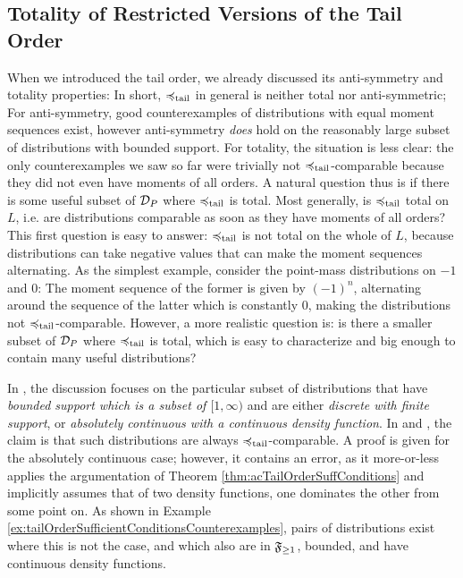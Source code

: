 \documentclass[a4paper]{scrreprt}
\begin{document}
    \subsection{Totality of Restricted Versions of the Tail Order}
    When we introduced the tail order, we already discussed its anti-symmetry and totality properties: In short, $\preccurlyeq_{\text{tail}}$ in general is neither total nor anti-symmetric; For anti-symmetry, good counterexamples of distributions with equal moment sequences exist, however anti-symmetry \emph{does} hold on the reasonably large subset of distributions with bounded support.
    For totality, the situation is less clear: the only counterexamples we saw so far were trivially not $\preccurlyeq_{\text{tail}}$-comparable because they did not even have moments of all orders.
    A natural question thus is if there is some useful subset of $\mathcal{D}_P$ where $\preccurlyeq_{\text{tail}}$ is total. Most generally, is $\preccurlyeq_{\text{tail}}$ total on $L$, i.e. are distributions comparable as soon as  they have moments of all orders? This first question is easy to answer: $\preccurlyeq_{\text{tail}}$ is not total on the whole of $L$, because distributions can take negative values that can make the moment sequences alternating. 
    As the simplest example, consider the point-mass distributions on $-1$ and $0$: The moment sequence of the former is given by $(-1)^n$, alternating around the sequence of the latter which is constantly $0$, making the distributions not $\preccurlyeq_{\text{tail}}$-comparable.
    However, a more realistic question is: is there a smaller subset of $\mathcal{D}_P$ where $\preccurlyeq_{\text{tail}}$ is total, which is easy to characterize and big enough to contain many useful distributions?
    
    In \cite{bib:rassGameRiskManagI,bib:rassTotalOrderingOnLossDistributions}, the discussion focuses on the particular subset of distributions that have \emph{bounded support which is a subset of $[1, \infty)$} and are either \emph{discrete with finite support}, or \emph{absolutely continuous with a continuous density function}.
    In \cite[Lemma 2]{bib:rassTotalOrderingOnLossDistributions} and \cite[Lemma 2.4]{bib:rassGameRiskManagI}, the claim is that such distributions are always $\preccurlyeq_{\text{tail}}$-comparable.
    A proof is given for the absolutely continuous case; however, it contains an error, as it more-or-less applies the argumentation of Theorem \ref{thm:acTailOrderSuffConditions} and implicitly assumes that of two density functions, one dominates the other from some point on. As shown in Example \ref{ex:tailOrderSufficientConditionsCounterexamples}, pairs of distributions exist where this is not the case, and which also are in $\mathfrak{F}_{\geq 1}$, bounded, and have continuous density functions.
    
\end{document}
